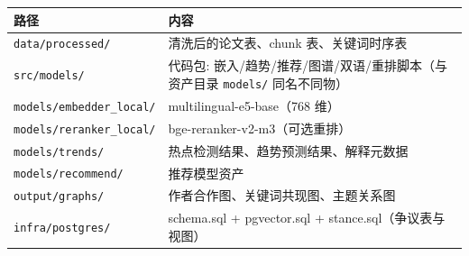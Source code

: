 \begin{center}
\begin{tabularx}{\textwidth}{p{44mm}X}
\toprule
路径 & 内容 \\
\midrule
\texttt{data/processed/} & 清洗后的论文表、chunk 表、关键词时序表 \\
\texttt{src/models/} & 代码包: 嵌入/趋势/推荐/图谱/双语/重排脚本（与资产目录 \texttt{models/} 同名不同物） \\
\texttt{models/embedder\_local/} & multilingual-e5-base（768 维） \\
\texttt{models/reranker\_local/} & bge-reranker-v2-m3（可选重排） \\
\texttt{models/trends/} & 热点检测结果、趋势预测结果、解释元数据 \\
\texttt{models/recommend/} & 推荐模型资产 \\
\texttt{output/graphs/} & 作者合作图、关键词共现图、主题关系图 \\
\texttt{infra/postgres/} & schema.sql + pgvector.sql + stance.sql（争议表与视图） \\
\bottomrule
\end{tabularx}
\end{center}

\clearpage
